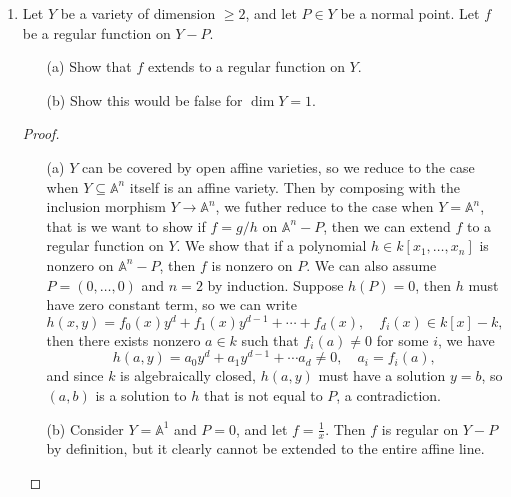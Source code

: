 \documentclass[12pt]{article}
\newcommand{\A}{\mathbb{A}}
\theoremstyle{definition}
\begin{document}
\begin{enumerate} [label=\textbf{\arabic*.}, leftmargin=-0.05em]
\item Let $Y$ be a variety of dimension $\geq 2$, and let $P \in Y$ be a normal point. Let $f$ be a regular function on $Y - P$.
\begin{itemize}
    \item[(a)] Show that $f$ extends to a regular function on $Y$.
    \item[(b)] Show this would be false for $\dim{Y} = 1$.
\end{itemize}

\begin{proof} $ $ \vspace{0pt}
    \begin{itemize}
        \item[(a)] $Y$ can be covered by open affine varieties, so we reduce to the case when $Y \subseteq \A^n$ itself is an affine variety. Then by composing with the inclusion morphism $Y \to \A^n$, we futher reduce to the case when $Y = \A^n$, that is we want to show if $f = g / h$ on $\A^n - P$, then we can extend $f$ to a regular function on $Y$. We show that if a polynomial $h \in k[x_1, \dots, x_n]$ is nonzero on $\A^n - P$, then $f$ is nonzero on $P$. We can also assume $P = (0, \dots, 0)$ and $n = 2$ by induction. Suppose $h(P) = 0$, then $h$ must have zero constant term, so we can write
        \begin{equation*}
            h(x, y) = f_0(x) y^d + f_1(x) y^{d - 1} + \cdots + f_d(x), \quad f_i(x) \in k[x] - k,
        \end{equation*}
        then there exists nonzero $a \in k$ such that $f_i(a) \neq 0$ for some $i$, we have
        \begin{equation*}
            h(a, y) = a_0 y^d + a_1 y^{d - 1} + \cdots a_d \neq 0, \quad a_i = f_i(a),
        \end{equation*}
        and since $k$ is algebraically closed, $h(a, y)$ must have a solution $y = b$, so $(a, b)$ is a solution to $h$ that is not equal to $P$, a contradiction.

        \item[(b)] Consider $Y = \A^1$ and $P = 0$, and let $f = \frac{1}{x}$. Then $f$ is regular on $Y - P$ by definition, but it clearly cannot be extended to the entire affine line.
    \end{itemize}
\end{proof}


\end{enumerate}
\end{document}
